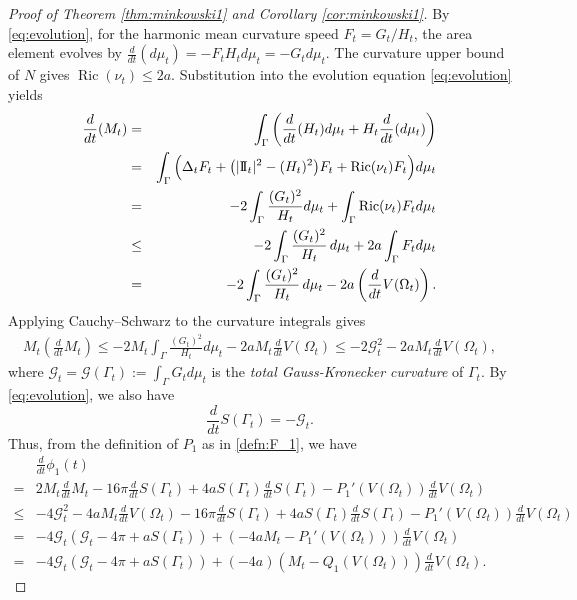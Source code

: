 \documentclass[11pt]{amsart}
\theoremstyle{definition}
\newcommand{\G}{\mathcal{G}}
\theoremstyle{remark}
\numberwithin{equation}{section}
\begin{document}
\begin{proof}[Proof of Theorem \ref{thm:minkowski1} and Corollary \ref{cor:minkowski1}]
	By \eqref{eq:evolution}, for the harmonic mean curvature speed \(F_t=G_t/H_t\), the area element evolves by $\frac{d}{dt}(d\mu_t) = -F_tH_td\mu_t = - G_t d\mu_t $. The curvature upper bound of $N$ gives \(\operatorname{Ric}(\nu_t)\le 2a\). Substitution into the evolution equation \eqref{eq:evolution} yields
	\begin{eqnarray}\label{eq:G'}\notag
		\frac{d}{dt}(M_t)&=&\int_{\Gamma}\left(\frac{d}{dt}(H_t)d\mu_t+H_t\frac{d}{dt}(d\mu_t)\right)\\ 
		&=&
		\int_{\Gamma}\Big(\Delta_t F_t+\big(|\mathrm{I\!I}_t|^2-(H_t)^2\big)F_t +\operatorname{Ric}(\nu_t)F_t\Big)d\mu_t\\ \notag
		&=&
		-2\int_{\Gamma}\frac{(G_t)^2}{H_t}d\mu_t
		+ \int_{\Gamma} \operatorname{Ric}(\nu_t) F_t d\mu_t \\ \notag
		&\leq&
		-2\int_{\Gamma}\frac{(G_t)^2}{H_t}\,d\mu_t + 2a \int_{\Gamma} F_t d\mu_t \\
		\notag
		&= &
		-2\int_{\Gamma}\frac{(G_t)^2}{H_t}\,d\mu_t - 2a \left(\frac{d}{dt}V(\Omega_t)\right).
	\end{eqnarray}
	Applying Cauchy--Schwarz to the curvature integrals gives
	\begin{align}\label{eq:CS}
		M_t \left( \frac{d}{dt} M_t \right)
		\leq
		-2 M_t\int_{\Gamma}\frac{(G_t)^2}{H_t}d\mu_t - 2a M_t \frac{d}{dt}V(\Omega_t)
		\leq
		-2\G_t^2 -2a M_t \frac{d}{dt}V(\Omega_t),
	\end{align}
	where $\G_t=\G(\Gamma_t):=\int_{\Gamma}G_t d\mu_t$ is the \emph{total Gauss-Kronecker curvature} of $\Gamma_t$.
	By \eqref{eq:evolution}, we also have
	$$
	\frac{d}{dt}S(\Gamma_t)=-\G_t.
	$$
	Thus, from the definition of $P_1$ as in \eqref{defn:F_1}, we have
	\begin{align}
		\label{eq:phi'}
		&\frac{d}{dt}\phi_1(t) 
		\\
		\nonumber
		=&
		2 M_t \frac{d}{dt}M_t
		-16\pi \frac{d}{dt}S(\Gamma_t) 
		+4aS(\Gamma_t)\frac{d}{dt}S(\Gamma_t)
		-  P_1'(V(\Omega_t)) \frac{d}{dt} V(\Omega_t)
		\\
		\nonumber
		\leq
		&
		-4 \G_t^2 -4 a M_t  \frac{d}{dt} V(\Omega_t) 
		-16\pi \frac{d}{dt}S(\Gamma_t) 
		+4aS(\Gamma_t)\frac{d}{dt}S(\Gamma_t)
		-  P_1'(V(\Omega_t)) \frac{d}{dt} V(\Omega_t)
		\\
		\nonumber
		=&
		-4 \G_t ( \G_t - 4\pi + a S(\Gamma_t))
		+
		(-4a M_t - P_1'(V(\Omega_t)) )\frac{d}{dt} V(\Omega_t)
		\\
		\nonumber
		=&
		-4 \G_t ( \G_t - 4\pi + a S(\Gamma_t))
		+
		(-4a)( M_t - Q_1(V(\Omega_t)) )\frac{d}{dt} V(\Omega_t).
	\end{align}
	

\end{proof}
\end{document}
